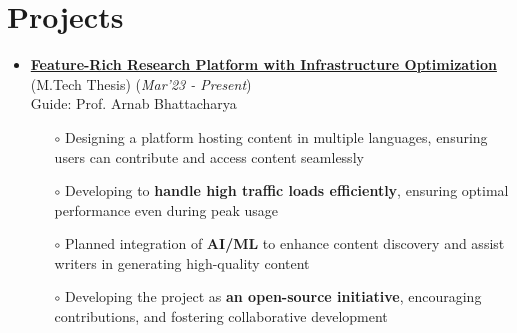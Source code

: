 \documentclass[10.8pt, a4paper]{extarticle}
\newcommand{\shorterSection}[1]{\vspace{-10pt}\section{#1}}
\begin{document}
\shorterSection{Projects}
\vspace{-2pt}
\begin{itemize}
   
  \item \href{~} {\textbf{Feature-Rich Research Platform with Infrastructure Optimization}} (M.Tech Thesis)  \hfill\hfill(\textit{Mar'23 - Present})\\Guide: Prof. Arnab Bhattacharya
  \begin{itemize}
    \item[$\circ$] Designing a platform hosting content in multiple languages, ensuring users can contribute and access content seamlessly\\[-0.6cm]
    \item[$\circ$] Developing to \textbf{handle high traffic loads efficiently}, ensuring optimal performance even during peak usage\\[-0.6cm]
    \item[$\circ$] Planned integration of \textbf{AI/ML} to enhance content discovery and assist writers in generating high-quality content \\[-0.6cm]
    \item[$\circ$] Developing the project as \textbf{an open-source initiative}, encouraging contributions, and fostering collaborative development \\[-0.6cm]
  \end{itemize}
  \vspace{0.055cm}

\end{itemize}
\end{document}
